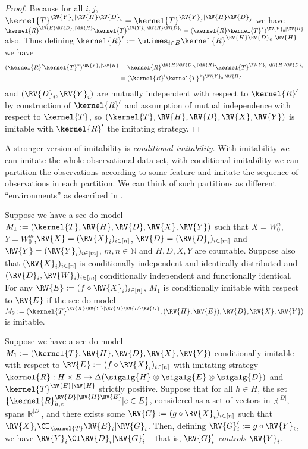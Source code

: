 \begin{proof}
Because for all $i,j$, $\kernel{T}^{\RV{Y}_i|\RV{H}\RV{D}_i}=\kernel{T}^{\RV{Y}_j|\RV{H}\RV{D}_j}$ we have $\kernel{R}^{\RV{H}\RV{D}_0|\RV{H}}\kernel{T}^{\RV{Y}_i|\RV{H}\RV{D}_i}=(\kernel{R}\kernel{T}^*)^{\RV{Y}_0|\RV{H}}$ also. Thus defining $\kernel{R}':= \utimes_{i\in B} \kernel{R}^{\RV{H}\RV{D}_0|\RV{H}}$ we have 
\begin{align}
    (\kernel{R}'\kernel{T}^*)^{\RV{Y}_i|\RV{H}} &= \kernel{R}^{\RV{H}\RV{D}_0|\RV{H}}\kernel{T}^{\RV{Y}_i|\RV{H}\RV{D}_i}\\
                                                &= (\kernel{R}'\kernel{T}^*)^{\RV{Y}_0|\RV{H}}
\end{align}
and $(\RV{D}_i,\RV{Y}_i)$ are mutually independent with respect to $\kernel{R}'$ by construction of $\kernel{R}'$ and assumption of mutual independence with respect to $\kernel{T}$, so $(\kernel{T},\RV{H},\RV{D},\RV{X},\RV{Y})$ is imitable with $\kernel{R}'$ the imitating strategy.
\end{proof}

A stronger version of imitability is \emph{conditional imitability}. With imitability we can imitate the whole observational data set, with conditional imitability we can partition the observations according to some feature and imitate the sequence of observations in each partition. We can think of such partitions as different ``environments'' as described in \citet{peters_causal_2016}.

\begin{definition}
Suppose we have a see-do model $M_1:=(\kernel{T},\RV{H},\RV{D},\RV{X},\RV{Y})$ such that $X=W_0^n$, $Y=W_0^m$,$\RV{X}=(\RV{X}_i)_{i\in [n]}$, $\RV{D}=(\RV{D}_i)_{i\in[m]}$ and $\RV{Y}=(\RV{Y}_i)_{i\in[m]}$, $m,n\in\mathbb{N}$ and $H,D,X,Y$ are countable. Suppose also that $(\RV{X}_i)_{i\in [n]}$ is conditionally independent and identically distributed and $(\RV{D}_i,\RV{W}_i)_{i\in[m]}$ conditionally independent and functionally identical. For any $\RV{E}:=(f\circ\RV{X}_i)_{i\in[n]}$, $M_1$ is conditionally imitable with respect to $\RV{E}$ if the see-do model $M_2:=(\kernel{T}^{\RV{X}\RV{Y}|\RV{H}\RV{E}\RV{D}},(\RV{H},\RV{E}),\RV{D},\RV{X},\RV{Y})$ is imitable.
\end{definition}

\begin{theorem}
Suppose we have a see-do model $M_1:=(\kernel{T},\RV{H},\RV{D},\RV{X},\RV{Y})$ conditionally imitable with respect to $\RV{E}:=(f\circ\RV{X}_i)_{i\in[n]}$ with imitating strategy $\kernel{R}:H\times E\to \Delta(\sigalg{H}\otimes\sigalg{E}\otimes\sigalg{D})$ and $\kernel{T}^{\RV{E}|\RV{H}}$ strictly positive. Suppose that for all $h\in H$, the set $\{\kernel{R}^{\RV{D}|\RV{H}\RV{E}}_{h,e}|e\in E\}$, considered as a set of vectors in $\mathbb{R}^{|D|}$, spans $\mathbb{R}^{|D|}$, and there exists some $\RV{G}:=(g\circ \RV{X}_i)_{i\in[n]}$ such that $\RV{X}_i\CI_{\kernel{T}}\RV{E}_i|\RV{G}_i$. Then, defining $\RV{G}'_i:=g\circ \RV{Y}_i$, we have $\RV{Y}_i\CI\RV{D}_i|\RV{G}'_i$ -- that is, $\RV{G}'_i$ \emph{controls} $\RV{Y}_i$.
\end{theorem}


